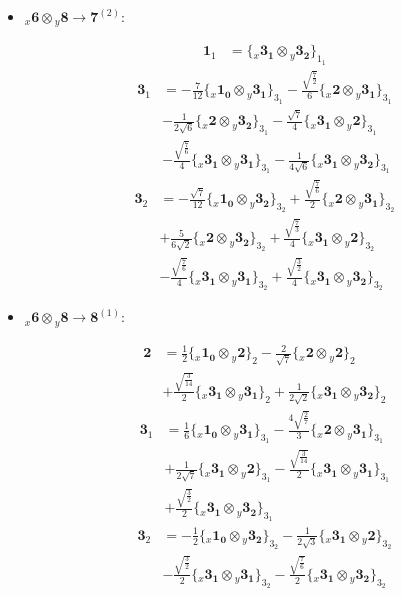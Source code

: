 \documentclass[english]{article}
\newcommand{\rep}[1]{\mathbf{#1}}
\newcommand{\repx}[2]{{}_{#2}\mathbf{#1}}
\newcommand{\tsprodx}[2]{\repx{#1}{x}\otimes\repx{#2}{y}}
\newcommand{\subcgs}[3]{\big\{ \tsprodx{#1}{#2}\big\}^{}_{#3}}
\begin{document}
\begin{itemize}
\begin{fleqn}
\end{fleqn}
\item $\tsprodx{6}{8}\to\rep{7}^{(2)}$:
\begin{fleqn}
\begin{align*}
\rep{1}_{1} & = \subcgs{3_{1}}{3_{2}}{1_{1}}
\end{align*}
\begin{align*}
\rep{3}_{1} & = -\frac{7}{12}\subcgs{1_{0}}{3_{1}}{3_{1}}-\frac{\sqrt{\frac{7}{2}}}{6}\subcgs{2}{3_{1}}{3_{1}} \\ 
 & -\frac{1}{2 \sqrt{6}}\subcgs{2}{3_{2}}{3_{1}}-\frac{\sqrt{7}}{4}\subcgs{3_{1}}{2}{3_{1}} \\ 
 & -\frac{\sqrt{\frac{7}{6}}}{4}\subcgs{3_{1}}{3_{1}}{3_{1}}-\frac{1}{4 \sqrt{6}}\subcgs{3_{1}}{3_{2}}{3_{1}}
\end{align*}
\begin{align*}
\rep{3}_{2} & = -\frac{\sqrt{7}}{12}\subcgs{1_{0}}{3_{2}}{3_{2}}+\frac{\sqrt{\frac{7}{6}}}{2}\subcgs{2}{3_{1}}{3_{2}} \\ 
 & +\frac{5}{6 \sqrt{2}}\subcgs{2}{3_{2}}{3_{2}}+\frac{\sqrt{\frac{7}{3}}}{4}\subcgs{3_{1}}{2}{3_{2}} \\ 
 & -\frac{\sqrt{\frac{7}{6}}}{4}\subcgs{3_{1}}{3_{1}}{3_{2}}+\frac{\sqrt{\frac{3}{2}}}{4}\subcgs{3_{1}}{3_{2}}{3_{2}}
\end{align*}
\end{fleqn}
\item $\tsprodx{6}{8}\to\rep{8}^{(1)}$:
\begin{fleqn}
\begin{align*}
\rep{2} & = \frac{1}{2}\subcgs{1_{0}}{2}{2}-\frac{2}{\sqrt{7}}\subcgs{2}{2}{2} \\ 
 & +\frac{\sqrt{\frac{3}{14}}}{2}\subcgs{3_{1}}{3_{1}}{2}+\frac{1}{2 \sqrt{2}}\subcgs{3_{1}}{3_{2}}{2}
\end{align*}
\begin{align*}
\rep{3}_{1} & = \frac{1}{6}\subcgs{1_{0}}{3_{1}}{3_{1}}-\frac{4 \sqrt{\frac{2}{7}}}{3}\subcgs{2}{3_{1}}{3_{1}} \\ 
 & +\frac{1}{2 \sqrt{7}}\subcgs{3_{1}}{2}{3_{1}}-\frac{\sqrt{\frac{3}{14}}}{2}\subcgs{3_{1}}{3_{1}}{3_{1}} \\ 
 & +\frac{\sqrt{\frac{3}{2}}}{2}\subcgs{3_{1}}{3_{2}}{3_{1}}
\end{align*}
\begin{align*}
\rep{3}_{2} & = -\frac{1}{2}\subcgs{1_{0}}{3_{2}}{3_{2}}-\frac{1}{2 \sqrt{3}}\subcgs{3_{1}}{2}{3_{2}} \\ 
 & -\frac{\sqrt{\frac{3}{2}}}{2}\subcgs{3_{1}}{3_{1}}{3_{2}}-\frac{\sqrt{\frac{7}{6}}}{2}\subcgs{3_{1}}{3_{2}}{3_{2}}

\end{align*}
\end{fleqn}
\end{itemize}
\end{document}
